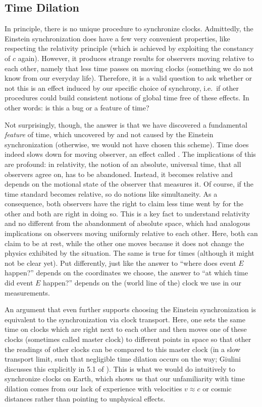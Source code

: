 		\subsection{Time Dilation}
In principle, there is no unique procedure to synchronize clocks. Admittedly, the Einstein synchronization does have a few very convenient properties, like respecting the relativity principle (which is achieved by exploiting the constancy of $c$ again). However, it produces strange results for observers moving relative to each other, namely that less time passes on moving clocks (something we do not know from our everyday life). Therefore, it is a valid question to ask whether or not this is an effect induced by our specific choice of synchrony, i.e.~if other procedures could build consistent notions of global time free of these effects. In other words: is this a bug or a feature of time?


Not surprisingly, though, the answer is that we have discovered a fundamental \emph{feature} of time, which uncovered by and not caused by the Einstein synchronization (otherwise, we would not have chosen this scheme). Time does indeed slows down for moving observer, an effect called . The implications of this are profound: in relativity, the notion of an absolute, universal time, that all observers agree on, has to be abandoned. Instead, it becomes relative and depends on the motional state of the observer that measures it. Of course, if the time standard becomes relative, so do notions like simultaneity. As a consequence, both observers have the right to claim less time went by for the other and both are right in doing so. This is a key fact to understand relativity and no different from the abandonment of absolute space, which had analogous implications on observers moving uniformly relative to each other. Here, both can claim to be at rest, while the other one moves because it does not change the physics exhibited by the situation. The same is true for times (although it might not be clear yet). Put differently, just like the answer to \enquote{where does event $E$ happen?} depends on the coordinates we choose, the answer to \enquote{at which time did event $E$ happen?} depends on the (world line of the) clock we use in our measurements.


An argument that even further supports choosing the Einstein synchronization is equivalent to the synchronization via clock transport. Here, one sets the same time on clocks which are right next to each other and then moves one of these clocks (sometimes called master clock) to different points in space so that other the readings of other clocks can be compared to this master clock (in a slow transport limit, such that negligible time dilation occurs on the way; Giulini discusses this explicitly in 5.1 of \cite{giulini_srt}). This is what we would do intuitively to synchronize clocks on Earth, which shows us that our unfamiliarity with time dilation comes from our lack of experience with velocities $v \approx c$ or cosmic distances rather than pointing to unphysical effects.\\


